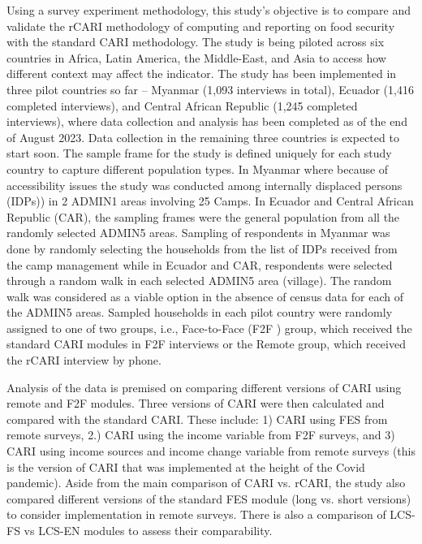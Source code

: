 \documentclass[11pt,harvard]{article}
\begin{document}
Using a survey experiment methodology, this study's objective is to compare and validate the rCARI methodology of computing and reporting on food security with the standard CARI methodology. The study is being piloted across six countries in Africa, Latin America, the Middle-East, and Asia to access how different context may affect the indicator. The study has been implemented in three pilot countries so far – Myanmar (1,093 interviews in total), Ecuador (1,416 completed interviews), and Central African Republic (1,245 completed interviews), where data collection and analysis has been completed as of the end of August 2023. Data collection in the remaining three countries is expected to start soon. The sample frame for the study is defined uniquely for each study country to capture different population types. In Myanmar where because of accessibility issues the study was conducted among internally displaced persons (IDPs)) in 2 ADMIN1 areas involving 25 Camps. In Ecuador and Central African Republic (CAR), the sampling frames were the general population from all the randomly selected ADMIN5 areas. Sampling of respondents in Myanmar was done by randomly selecting the households from the list of IDPs received from the camp management while in Ecuador and CAR, respondents were selected through a random walk in each selected ADMIN5 area (village). The random walk was considered as a viable option in the absence of census data for each of the ADMIN5 areas. Sampled households in each pilot country were randomly assigned to one of two groups, i.e., Face-to-Face (F2F ) group, which received the standard CARI modules in F2F interviews or the Remote group, which received the rCARI interview by phone. 

Analysis of the data is premised on comparing different versions of CARI using remote and F2F modules. Three versions of CARI were then calculated and compared with the standard CARI. These include: 1) CARI using FES from remote surveys, 2.) CARI using the income variable from F2F surveys, and 3) CARI using income sources and income change variable from remote surveys (this is the version of CARI that was implemented at the height of the Covid pandemic).  Aside from the main comparison of CARI vs. rCARI, the study also compared different versions of the standard FES module (long vs. short versions) to consider implementation in remote surveys. There is also a comparison of LCS-FS vs LCS-EN modules to assess their comparability.
\end{document}
